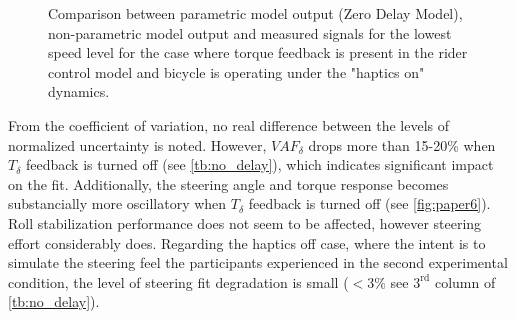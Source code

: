 
\begin{figure}[!h]
    \centering
        \centering
        \caption{Comparison between parametric model output (Zero Delay Model), non-parametric model output and measured signals for the lowest speed level for the case where torque feedback is present in the rider control model and bicycle is operating under the "haptics on" dynamics.}
    \label{fig:zdm_raw}
 \end{figure}


From the coefficient of variation, no real difference between the levels of normalized uncertainty is noted. However, \ensuremath{\mathit{VAF}_\delta} drops more than 15-20\% when \ensuremath{T_\delta} feedback is turned off (see \cref{tb:no_delay}), which indicates significant impact on the fit. Additionally,  the steering angle and torque response   becomes substancially more oscillatory when \ensuremath{{T_\delta}} feedback is turned off (see \cref{fig:paper6}). Roll stabilization performance does not seem to be affected, however steering effort considerably does. Regarding the haptics off case, where the intent is to simulate the steering feel the participants experienced in the second experimental condition, the level of steering fit degradation is small (\ensuremath{<3\%} see \ensuremath{3^{\text{rd}}} column of \cref{tb:no_delay}).

